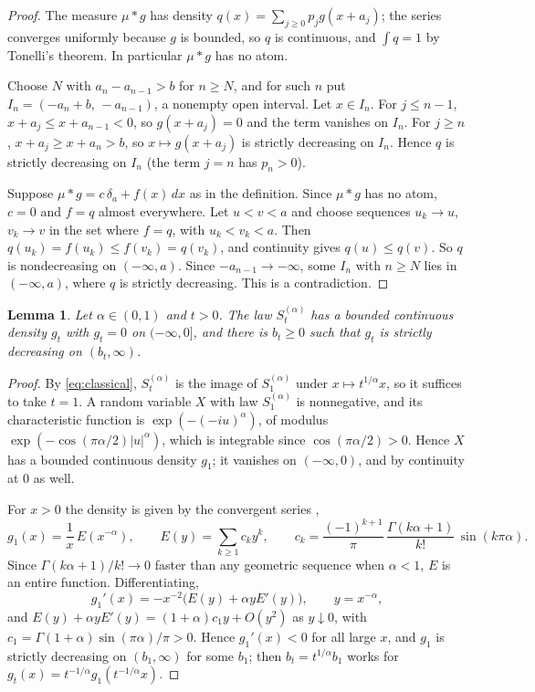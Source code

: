 \documentclass[11pt]{amsart}
\newtheorem{lemma}[theorem]{Lemma}
\theoremstyle{definition}
\theoremstyle{remark}
\numberwithin{equation}{section}
\begin{document}
\begin{proof}
The measure $\mu*g$ has density $q(x)=\sum_{j\ge0}p_jg(x+a_j)$; the series converges uniformly because $g$ is bounded, so $q$ is continuous, and $\int q=1$ by Tonelli's theorem. In particular $\mu*g$ has no atom.

Choose $N$ with $a_n-a_{n-1}>b$ for $n\ge N$, and for such $n$ put $I_n=(-a_n+b,\,-a_{n-1})$, a nonempty open interval. Let $x\in I_n$. For $j\le n-1$, $x+a_j\le x+a_{n-1}<0$, so $g(x+a_j)=0$ and the term vanishes on $I_n$. For $j\ge n$, $x+a_j\ge x+a_n>b$, so $x\mapsto g(x+a_j)$ is strictly decreasing on $I_n$. Hence $q$ is strictly decreasing on $I_n$ (the term $j=n$ has $p_n>0$).

Suppose $\mu*g=c\,\delta_a+f(x)\,dx$ as in the definition. Since $\mu*g$ has no atom, $c=0$ and $f=q$ almost everywhere. Let $u<v<a$ and choose sequences $u_k\to u$, $v_k\to v$ in the set where $f=q$, with $u_k<v_k<a$. Then $q(u_k)=f(u_k)\le f(v_k)=q(v_k)$, and continuity gives $q(u)\le q(v)$. So $q$ is nondecreasing on $(-\infty,a)$. Since $-a_{n-1}\to-\infty$, some $I_n$ with $n\ge N$ lies in $(-\infty,a)$, where $q$ is strictly decreasing. This is a contradiction.
\end{proof}

\begin{lemma}\label{lem:kernel}
Let $\alpha\in(0,1)$ and $t>0$. The law $S^{(\alpha)}_t$ has a bounded continuous density $g_t$ with $g_t=0$ on $(-\infty,0]$, and there is $b_t\ge0$ such that $g_t$ is strictly decreasing on $(b_t,\infty)$.
\end{lemma}

\begin{proof}
By \eqref{eq:classical}, $S^{(\alpha)}_t$ is the image of $S^{(\alpha)}_1$ under $x\mapsto t^{1/\alpha}x$, so it suffices to take $t=1$. A random variable $X$ with law $S^{(\alpha)}_1$ is nonnegative, and its characteristic function is $\exp(-(-iu)^\alpha)$, of modulus $\exp(-\cos(\pi\alpha/2)|u|^\alpha)$, which is integrable since $\cos(\pi\alpha/2)>0$. Hence $X$ has a bounded continuous density $g_1$; it vanishes on $(-\infty,0)$, and by continuity at $0$ as well.

For $x>0$ the density is given by the convergent series \cite[Lemma XVII.6.1]{Feller}, \cite{Pollard}
\begin{equation}\label{eq:series}
g_1(x)=\frac1{x}\,E(x^{-\alpha}),\qquad E(y)=\sum_{k\ge1}c_ky^k,\qquad c_k=\frac{(-1)^{k+1}}{\pi}\,\frac{\Gamma(k\alpha+1)}{k!}\,\sin(k\pi\alpha).
\end{equation}
Since $\Gamma(k\alpha+1)/k!\to0$ faster than any geometric sequence when $\alpha<1$, $E$ is an entire function. Differentiating,
\[
g_1'(x)=-x^{-2}\bigl(E(y)+\alpha yE'(y)\bigr),\qquad y=x^{-\alpha},
\]
and $E(y)+\alpha yE'(y)=(1+\alpha)c_1y+O(y^2)$ as $y\downarrow0$, with $c_1=\Gamma(1+\alpha)\sin(\pi\alpha)/\pi>0$. Hence $g_1'(x)<0$ for all large $x$, and $g_1$ is strictly decreasing on $(b_1,\infty)$ for some $b_1$; then $b_t=t^{1/\alpha}b_1$ works for $g_t(x)=t^{-1/\alpha}g_1(t^{-1/\alpha}x)$.
\end{proof}
\end{document}

